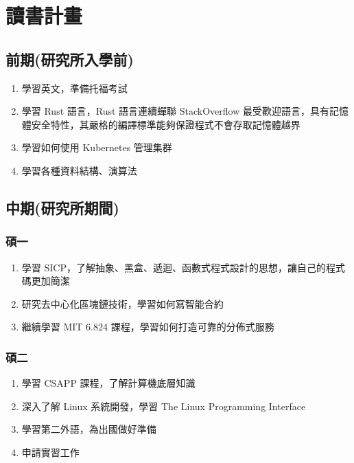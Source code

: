 \documentclass[classical]{einfart}
\providecommand{\tightlist}{%
  \setlength{\itemsep}{0pt}\setlength{\parskip}{0pt}}
\begin{document}
\section{讀書計畫}

\subsection{前期(研究所入學前)}

\begin{enumerate}
\def\labelenumi{\arabic{enumi}.}
\tightlist
\item
  學習英文，準備托福考試
\item
  學習 Rust 語言，Rust 語言連續蟬聯 StackOverflow
  最受歡迎語言，具有記憶體安全特性，其嚴格的編譯標準能夠保證程式不會存取記憶體越界
\item
  學習如何使用 Kubernetes 管理集群
\item
  學習各種資料結構、演算法
\end{enumerate}

\subsection{中期(研究所期間)}

\subsubsection{碩一}

\begin{enumerate}
\def\labelenumi{\arabic{enumi}.}
\tightlist
\item
  學習
  SICP，了解抽象、黑盒、遞迴、函數式程式設計的思想，讓自己的程式碼更加簡潔
\item
  研究去中心化區塊鏈技術，學習如何寫智能合約
\item
  繼續學習 MIT 6.824 課程，學習如何打造可靠的分佈式服務
\end{enumerate}

\subsubsection{碩二}

\begin{enumerate}
\def\labelenumi{\arabic{enumi}.}
\tightlist
\item
  學習 CSAPP 課程，了解計算機底層知識
\item
  深入了解 Linux 系統開發，學習 The Linux Programming Interface
\item
  學習第二外語，為出國做好準備
\item
  申請實習工作
\end{enumerate}
\end{document}
